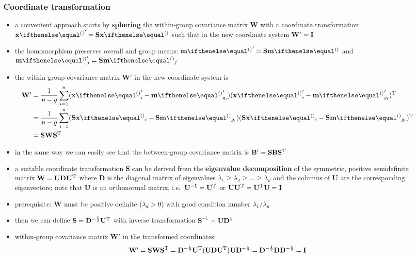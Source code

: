 \documentclass[a4paper]{article}
\begin{document}
\subsubsection{Coordinate transformation}
\label{sec:lda:standard:sphering}

\begin{itemize}
\item a convenient approach starts by \textbf{sphering} the within-group covariance matrix $\mathbf{W}$ with a coordinate transformation $\vx' = \mathbf{S} \vx$ such that in the new coordinate system $\mathbf{W}' = \mathbf{I}$
\item the homomorphism preserves overall and group means: $\vm' = \mathbf{S} \vm$ and $\vm'_j = \mathbf{S} \vm_j$
\item the within-group covariance matrix $\mathbf{W}'$ in the new coordinate system is
  \begin{equation}
    \label{eq:lda:Wprime}
    \begin{split}
      \mathbf{W}'
      &= \frac1{n-g} \sum_{i=1}^n (\vx'_i - \vm'_{g_i}) (\vx'_i - \vm'_{g_i})\T \\
      &= \frac1{n-g} \sum_{i=1}^n (\mathbf{S}\vx_i - \mathbf{S}\vm_{g_i}) (\mathbf{S}\vx_i - \mathbf{S}\vm_{g_i})\T \\
      &= \mathbf{S} \mathbf{W} \mathbf{S}\T
    \end{split}
  \end{equation}
\item in the same way we can easily see that the between-group covariance matrix is $\mathbf{B}' = \mathbf{S} \mathbf{B} \mathbf{S}^{\text{T}}$
\item a suitable coordinate transformation $\mathbf{S}$ can be derived from the \textbf{eigenvalue decomposition} of the symmetric, positive semidefinite matrix $\mathbf{W} = \mathbf{U} \mathbf{D} \mathbf{U}^{\text{T}}$ where $\mathbf{D}$ is the diagonal matrix of eigenvalues $\lambda_1 \geq \lambda_2 \geq \ldots \geq \lambda_d$ and the columns of $\mathbf{U}$ are the corresponding eigenvectors; note that $\mathbf{U}$ is an orthonormal matrix, i.e.\ $\mathbf{U}^{-1} = \mathbf{U}^{\text{T}}$ or $\mathbf{U} \mathbf{U}^{\text{T}} = \mathbf{U}^{\text{T}} \mathbf{U} = \mathbf{I}$
\item prerequisite: $\mathbf{W}$ must be positive definite ($\lambda_d > 0$) with good condition number $\lambda_1 / \lambda_d$
\item then we can define $\mathbf{S} = \mathbf{D}^{-\frac12} \mathbf{U}^{\text{T}}$ with inverse transformation $\mathbf{S}^{-1} = \mathbf{U} \mathbf{D}^{\frac12}$
\item within-group covariance matrix $\mathbf{W}'$ in the transformed coordinates:
  \begin{equation}
    \label{eq:lda:Wprime-I}
    \mathbf{W}'
    = \mathbf{S} \mathbf{W} \mathbf{S}^{\text{T}}
    = \mathbf{D}^{-\frac12} \mathbf{U}^{\text{T}} ( \mathbf{U} \mathbf{D} \mathbf{U}^{\text{T}} ) \mathbf{U} \mathbf{D}^{-\frac12} 
    = \mathbf{D}^{-\frac12} \mathbf{D} \mathbf{D}^{-\frac12}
    = \mathbf{I}
  \end{equation}
\end{itemize}
\end{document}

